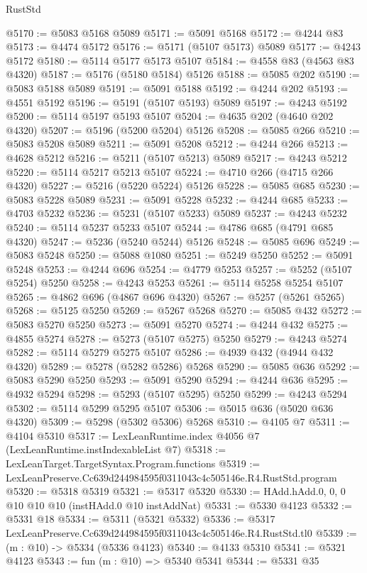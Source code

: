 \begin{lexlean}{RustStd}
\begin{coremodule}
@5170 := @5083 @5168 @5089
@5171 := @5091 @5168
@5172 := @4244 @83
@5173 := @4474 @5172
@5176 := @5171 (@5107 @5173) @5089
@5177 := @4243 @5172
@5180 := @5114 @5177 @5173 @5107
@5184 := @4558 @83 (@4563 @83 @4320)
@5187 := @5176 (@5180 @5184) @5126
@5188 := @5085 @202
@5190 := @5083 @5188 @5089
@5191 := @5091 @5188
@5192 := @4244 @202
@5193 := @4551 @5192
@5196 := @5191 (@5107 @5193) @5089
@5197 := @4243 @5192
@5200 := @5114 @5197 @5193 @5107
@5204 := @4635 @202 (@4640 @202 @4320)
@5207 := @5196 (@5200 @5204) @5126
@5208 := @5085 @266
@5210 := @5083 @5208 @5089
@5211 := @5091 @5208
@5212 := @4244 @266
@5213 := @4628 @5212
@5216 := @5211 (@5107 @5213) @5089
@5217 := @4243 @5212
@5220 := @5114 @5217 @5213 @5107
@5224 := @4710 @266 (@4715 @266 @4320)
@5227 := @5216 (@5220 @5224) @5126
@5228 := @5085 @685
@5230 := @5083 @5228 @5089
@5231 := @5091 @5228
@5232 := @4244 @685
@5233 := @4703 @5232
@5236 := @5231 (@5107 @5233) @5089
@5237 := @4243 @5232
@5240 := @5114 @5237 @5233 @5107
@5244 := @4786 @685 (@4791 @685 @4320)
@5247 := @5236 (@5240 @5244) @5126
@5248 := @5085 @696
@5249 := @5083 @5248
@5250 := @5088 @1080
@5251 := @5249 @5250
@5252 := @5091 @5248
@5253 := @4244 @696
@5254 := @4779 @5253
@5257 := @5252 (@5107 @5254) @5250
@5258 := @4243 @5253
@5261 := @5114 @5258 @5254 @5107
@5265 := @4862 @696 (@4867 @696 @4320)
@5267 := @5257 (@5261 @5265)
@5268 := @5125 @5250
@5269 := @5267 @5268
@5270 := @5085 @432
@5272 := @5083 @5270 @5250
@5273 := @5091 @5270
@5274 := @4244 @432
@5275 := @4855 @5274
@5278 := @5273 (@5107 @5275) @5250
@5279 := @4243 @5274
@5282 := @5114 @5279 @5275 @5107
@5286 := @4939 @432 (@4944 @432 @4320)
@5289 := @5278 (@5282 @5286) @5268
@5290 := @5085 @636
@5292 := @5083 @5290 @5250
@5293 := @5091 @5290
@5294 := @4244 @636
@5295 := @4932 @5294
@5298 := @5293 (@5107 @5295) @5250
@5299 := @4243 @5294
@5302 := @5114 @5299 @5295 @5107
@5306 := @5015 @636 (@5020 @636 @4320)
@5309 := @5298 (@5302 @5306) @5268
@5310 := @4105 @7
@5311 := @4104 @5310
@5317 := LexLeanRuntime.index @4056 @7 (LexLeanRuntime.instIndexableList @7)
@5318 := LexLeanTarget.TargetSyntax.Program.functions
@5319 := LexLeanPreserve.Cc639d244984595f0311043c4c505146e.R4.RustStd.program
@5320 := @5318 @5319
@5321 := @5317 @5320
@5330 := HAdd.hAdd.{0, 0, 0} @10 @10 @10 (instHAdd.{0} @10 instAddNat)
@5331 := @5330 @4123
@5332 := @5331 @18
@5334 := @5311 (@5321 @5332)
@5336 := @5317 LexLeanPreserve.Cc639d244984595f0311043c4c505146e.R4.RustStd.tl0
@5339 := (m : @10) -> @5334 (@5336 @4123)
@5340 := @4133 @5310
@5341 := @5321 @4123
@5343 := fun (m : @10) => @5340 @5341
@5344 := @5331 @35

\end{coremodule}
\end{lexlean}
